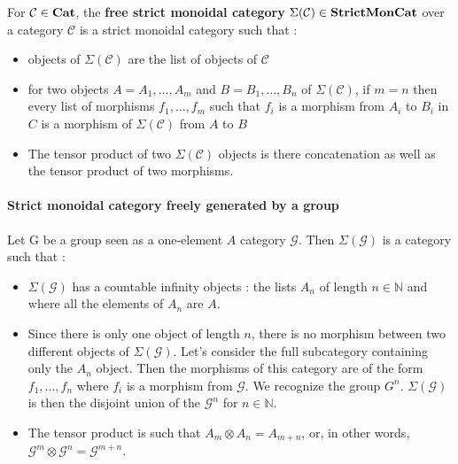 \begin{defn}
    For $\mathcal{C} \in \bf Cat$, the \textbf{free strict monoidal category} $ \Sigma (\mathcal{C})\in \bf StrictMonCat$ over a category $\mathcal{C}$ is a strict monoidal category such that :
    \begin{itemize}
        \item objects of $\Sigma (\mathcal{C})$ are the list of objects of $\mathcal{C}$
        \item for two objects $A = A_1,\dots,A_m$ and $B = B_1,\dots,B_n$ of $\Sigma (\mathcal{C})$, if $m = n$ then every list of morphisms $f_1,\dots,f_m$ such that $f_i$ is a morphism from $A_i$ to $B_i$ in $C$ is a morphism of $\Sigma(\mathcal{C})$ from $A$ to $B$
        \item The tensor product of two $\Sigma(\mathcal{C})$ objects is there concatenation as well as the tensor product of two morphisms.
    \end{itemize}
\end{defn}

\paragraph{Strict monoidal category freely generated by a group}


Let G  be a group seen as a one-element $A$ category $\mathcal{G}$. Then $ \Sigma(\mathcal{G})$ is a category such that :
\begin{itemize}
    \item $\Sigma(\mathcal{G})$ has a countable infinity objects : the lists $A_n$ of length $n \in \mathbb{N}$ and where all the elements of $A_n$ are $A$.
    \item Since there is only one object of length $n$, there is no morphism between two different objects of $\Sigma(\mathcal{G})$. Let's consider the full subcategory containing only the $A_n$ object. Then the morphisms of this category are of the form $f_1,...,f_n$ where $f_i$ is a morphism from $\mathcal{G}$. We recognize the group $G^{n}$. $\Sigma (\mathcal{G})$ is then the disjoint union of the $\mathcal{G}^{n}$ for $ n\in\mathbb{N}$.
    \item  The tensor product is such that  $A_m \otimes A_n = A_{m+n}$, or, in other words, $\mathcal{G}^m \otimes \mathcal{G}^n = \mathcal{G}^{m+n}$.
\end{itemize}

